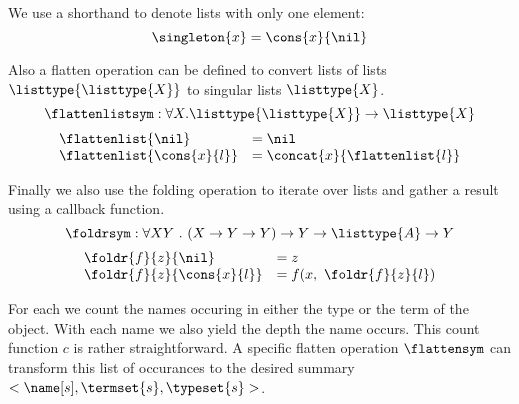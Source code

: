 \begin{definition}[\singleton{-}]
  We use a shorthand to denote lists with only one element:
  \[ \singleton{x} = \cons{x}{\nil} \]
\end{definition}

\begin{definition}[\flattenlistsym]
  Also a flatten operation can be defined to convert lists of lists $\listtype{\listtype{X}}$ to singular lists $\listtype{X}$.
  \[ \flattenlistsym : \forall X . \listtype{\listtype{X}} \rightarrow \listtype{X} \]
  \[ \begin{array}{ll}
      \flattenlist{\nil} & = \nil \\
      \flattenlist{\cons{x}{l}} & = \concat{x}{\flattenlist{l}} \\
    \end{array} \]
\end{definition}

\begin{definition}[\foldrsym]
  Finally we also use the folding operation to iterate over lists and gather a result using a callback function.
  \[ \foldrsym : \forall X Y ~.~ (X \rightarrow Y \rightarrow Y) \rightarrow Y \rightarrow \listtype{A} \rightarrow Y \]
  \[ \begin{array}{ll}
      \foldr{f}{z}{\nil} & = z \\
      \foldr{f}{z}{\cons{x}{l}} & = f(x,~ \foldr{f}{z}{l})
    \end{array}\]
\end{definition}

For each \coqobj[s] we count the names occuring in either the type or the term of the object.
With each name we also yield the depth the name occurs.
This count function $c$ is rather straightforward.
A specific flatten operation $\flattensym$ can transform this list of occurances to the desired summary $<\name[s], \termset{s}, \typeset{s}>$.


